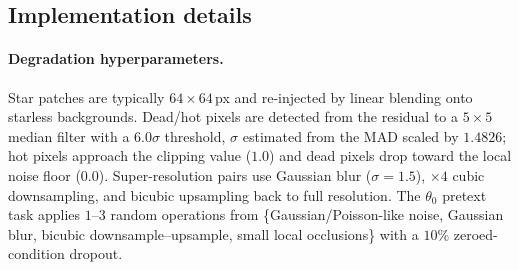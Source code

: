 \documentclass{article}
\begin{document}
%

\subsection*{Implementation details}

\paragraph*{Degradation hyperparameters.} Star patches are typically $64\times64$\,px and re-injected by linear blending onto starless backgrounds. Dead/hot pixels are detected from the residual to a $5\times5$ median filter with a $6.0\sigma$ threshold, $\sigma$ estimated from the MAD scaled by $1.4826$; hot pixels approach the clipping value ($1.0$) and dead pixels drop toward the local noise floor ($0.0$). Super-resolution pairs use Gaussian blur ($\sigma=1.5$), $\times4$ cubic downsampling, and bicubic upsampling back to full resolution. The $\theta_0$ pretext task applies $1$--$3$ random operations from \{Gaussian/Poisson-like noise, Gaussian blur, bicubic downsample--upsample, small local occlusions\} with a $10\%$ zeroed-condition dropout.
\end{document}
